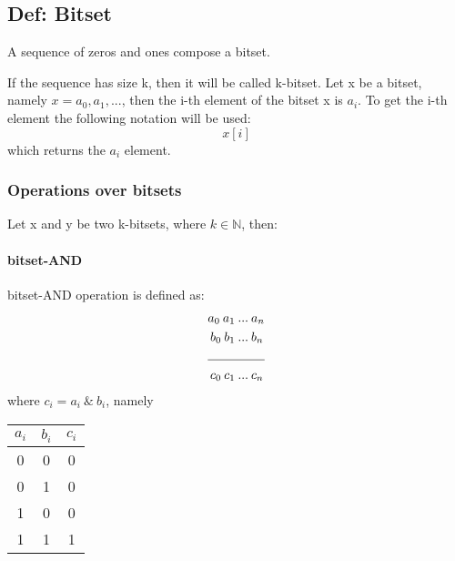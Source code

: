 \documentclass{article}
\begin{document}
	\subsection*{Def: Bitset}
		A sequence of zeros and ones compose a bitset.

		If the sequence has size k, then it will be called k-bitset.
		\newline
		\newline
		Let x be a bitset, namely $x = a_0, a_1, ...$, then the i-th element of the bitset x is $a_i$. 
		To get the i-th element the following notation will be used:
		\begin{equation}
			x[i]
		\end{equation}
		which returns the $a_i$ element.

		\subsubsection*{Operations over bitsets}
			Let x and y be two k-bitsets, where $k \in \mathbb{N}$, then: 
			\newline
			\newline
			\paragraph{bitset-AND}
			bitset-AND operation is defined as:
			\newline
			\begin{align*}
				a_0 \: a_1 \: ... & \: a_n \\
				b_0 \: b_1 \: ... & \: b_n \\
				 \cline{1-2}
				c_0 \: c_1 \: ... & \: c_n
			\end{align*}
			where $c_i = a_i \: \& \: b_i$, namely
			\newline
			\begin{center}
				\begin{tabular}{cc|c}
					$a_i$ & $b_i$ & $c_i$  \\
					\hline
					0 & 0 & 0 \\
					0 & 1 & 0 \\
					1 & 0 & 0 \\
					1 & 1 & 1 \\
				\end{tabular} 
			\end{center}
\end{document}
